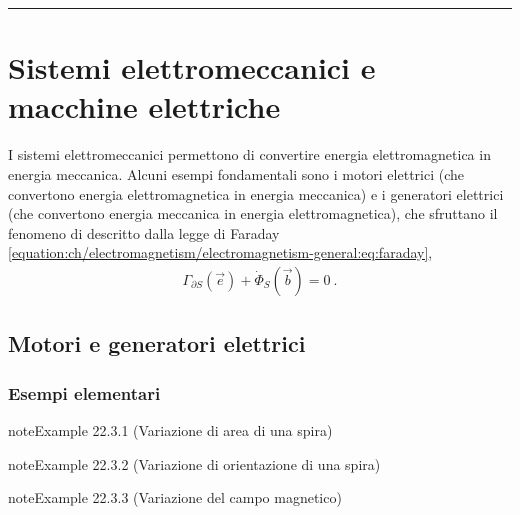 \documentclass[letterpaper,10pt,italian]{jupyterBook}
\begin{document}
\bigskip\hrule\bigskip


\sphinxstepscope


\section{Sistemi elettromeccanici e macchine elettriche}
\label{\detokenize{ch/electromagnetism/electric-machines:sistemi-elettromeccanici-e-macchine-elettriche}}\label{\detokenize{ch/electromagnetism/electric-machines:physics-hs-electromagnetism-electric-machines}}\label{\detokenize{ch/electromagnetism/electric-machines::doc}}
\sphinxAtStartPar
I sistemi elettromeccanici permettono di convertire energia elettromagnetica in energia meccanica. Alcuni esempi fondamentali sono i motori elettrici (che convertono energia elettromagnetica in energia meccanica) e i generatori elettrici (che convertono energia meccanica in energia elettromagnetica), che sfruttano il fenomeno di {\hyperref[\detokenize{ch/electromagnetism/electromagnetism-general:physics-hs-electromagnetism-electromagnetism-general-em-induction}]{}} descritto dalla legge di Faraday \eqref{equation:ch/electromagnetism/electromagnetism-general:eq:faraday},
\begin{equation*}
\begin{split}\Gamma_{\partial S}(\vec{e}) + \dot{\Phi}_{S}(\vec{b}) = 0 \ .\end{split}
\end{equation*}

\subsection{Motori e generatori elettrici}
\label{\detokenize{ch/electromagnetism/electric-machines:motori-e-generatori-elettrici}}\label{\detokenize{ch/electromagnetism/electric-machines:physics-hs-electromagnetism-electric-machines-motor}}

\subsubsection{Esempi elementari}
\label{\detokenize{ch/electromagnetism/electric-machines:esempi-elementari}}\label{\detokenize{ch/electromagnetism/electric-machines:physics-hs-electromagnetism-electric-machines-motor-simple}}\label{ch/electromagnetism/electric-machines:motor:simple:darea}
\begin{sphinxadmonition}{note}{Example 22.3.1 (Variazione di area di una spira)}


\end{sphinxadmonition}
\label{ch/electromagnetism/electric-machines:motor:simple:dangle}
\begin{sphinxadmonition}{note}{Example 22.3.2 (Variazione di orientazione di una spira)}


\end{sphinxadmonition}
\label{ch/electromagnetism/electric-machines:motor:simple:db}
\begin{sphinxadmonition}{note}{Example 22.3.3 (Variazione del campo magnetico)}


\end{sphinxadmonition}
\end{document}
